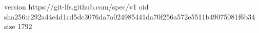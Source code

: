 version https://git-lfs.github.com/spec/v1
oid sha256:c292a44e4d1cd5dc3076da7a024985441da70f256a572e5511b49075081f6b34
size 1792
